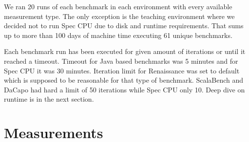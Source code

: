 \begin{table}[ht]
  \centering
  \caption{Summary of selected platforms.}
  \label{table:envs}
\end{table}

We ran 20 runs of each benchmark in each environment with every available measurement type.
The only exception is the teaching environment where we decided not to run Spec CPU due to disk and runtime requirements.
That sums up to more than 100 days of machine time executing 61 unique benchmarks.

Each benchmark run has been executed for given amount of iterations or until it reached a timeout.
Timeout for Java based benchmarks was 5 minutes and for Spec CPU it was 30 minutes.
Iteration limit for Renaissance was set to default which is supposed to be reasonable for that type of benchmark.
ScalaBench and DaCapo had hard a limit of 50 iterations while Spec CPU only 10.
Deep dive on runtime is in the next section.

\section{Measurements}
\label{sec:measurements}

